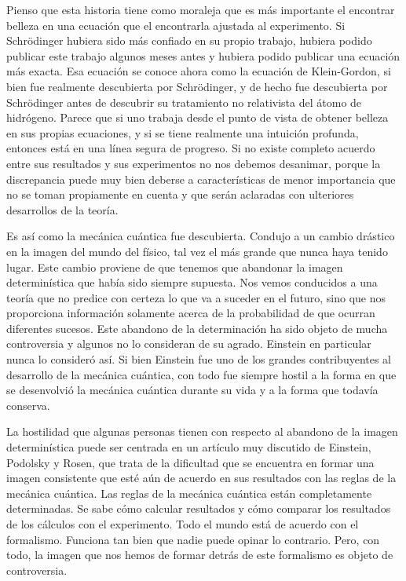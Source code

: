 \documentclass[a4paper, 12pt]{article}
\begin{document}
Pienso que esta historia tiene como moraleja que es más importante el encontrar belleza en una ecuación que el encontrarla ajustada al experimento. Si Schrödinger hubiera sido más confiado en su propio trabajo, hubiera podido publicar este trabajo algunos meses antes y hubiera podido publicar una ecuación más exacta. Esa ecuación se conoce ahora como la ecuación de Klein-Gordon, si bien fue realmente descubierta por Schrödinger, y de hecho fue descubierta por Schrödinger antes de descubrir su tratamiento no relativista del átomo de hidrógeno. Parece que si uno trabaja desde el punto de vista de obtener belleza en sus propias ecuaciones, y si se tiene realmente una intuición profunda, entonces está en una línea segura de progreso. Si no existe completo acuerdo entre sus resultados y sus experimentos no nos debemos desanimar, porque la discrepancia puede muy bien deberse a características de menor importancia que no se toman propiamente en cuenta y que serán aclaradas con ulteriores desarrollos de la teoría. 

Es así como la mecánica cuántica fue descubierta. Condujo a un cambio drástico en la imagen del mundo del físico, tal vez el más grande que nunca haya tenido lugar. Este cambio proviene de que tenemos que abandonar la imagen determinística que había sido siempre supuesta. Nos vemos conducidos a una teoría que no predice con certeza lo que va a suceder en el futuro, sino que nos proporciona información solamente acerca de la probabilidad de que ocurran diferentes sucesos. Este abandono de la determinación ha sido objeto de mucha controversia y algunos no lo consideran de su agrado. Einstein en particular nunca lo consideró así. Si bien Einstein fue uno de los grandes contribuyentes al desarrollo de la mecánica cuántica, con todo fue siempre hostil a la forma en que se desenvolvió la mecánica cuántica durante su vida y a la forma que todavía conserva.

La hostilidad que algunas personas tienen con respecto al abandono de la imagen determinística puede ser centrada en un artículo muy discutido de Einstein, Podolsky y Rosen, que trata de la dificultad que se encuentra en formar una imagen consistente que esté aún de acuerdo en sus resultados con las reglas de la mecánica cuántica. Las reglas de la mecánica cuántica están completamente determinadas. Se sabe cómo calcular resultados y cómo comparar los resultados de los cálculos con el experimento. Todo el mundo está de acuerdo con el formalismo. Funciona tan bien que nadie puede opinar lo contrario. Pero, con todo, la imagen que nos hemos de formar detrás de este formalismo es objeto de controversia.
\end{document}
